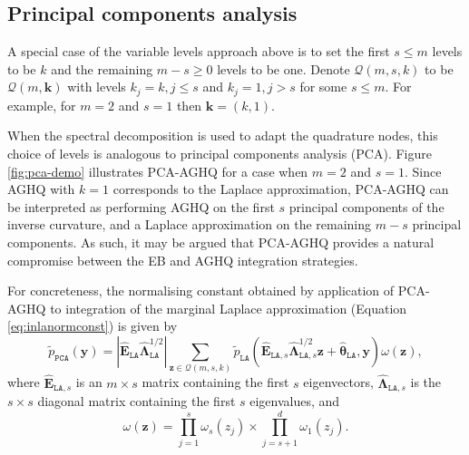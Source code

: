 \documentclass[a4paper, nobind]{templates/ociamthesis}
\begin{document}
\hypertarget{principal-components-analysis}{%
\subsection{Principal components analysis}\label{principal-components-analysis}}

A special case of the variable levels approach above is to set the first \(s \leq m\) levels to be \(k\) and the remaining \(m - s \geq 0\) levels to be one.
Denote \(\mathcal{Q}(m, s, k)\) to be \(\mathcal{Q}(m, \mathbf{k})\) with levels \(k_j = k, j \leq s\) and \(k_j = 1, j > s\) for some \(s \leq m\).
For example, for \(m = 2\) and \(s = 1\) then \(\mathbf{k} = (k, 1)\).

When the spectral decomposition is used to adapt the quadrature nodes, this choice of levels is analogous to principal components analysis (PCA).
Figure \ref{fig:pca-demo} illustrates PCA-AGHQ for a case when \(m = 2\) and \(s = 1\).
Since AGHQ with \(k = 1\) corresponds to the Laplace approximation, PCA-AGHQ can be interpreted as performing AGHQ on the first \(s\) principal components of the inverse curvature, and a Laplace approximation on the remaining \(m - s\) principal components.
As such, it may be argued that PCA-AGHQ provides a natural compromise between the EB and AGHQ integration strategies.

For concreteness, the normalising constant obtained by application of PCA-AGHQ to integration of the marginal Laplace approximation (Equation \eqref{eq:inlanormconst}) is given by
\begin{equation}
\tilde p_\texttt{PCA}(\mathbf{y}) = |\hat{\mathbf{E}}_{\texttt{LA}} \hat{\mathbf{\Lambda}}_{\texttt{LA}}^{1/2}|\sum_{\mathbf{z} \in \mathcal{Q}(m, s, k)} \tilde p_\texttt{LA}(\hat{\mathbf{E}}_{\texttt{LA}, s} \hat{\mathbf{\Lambda}}_{\texttt{LA}, s}^{1/2} \mathbf{z} + \hat{\boldsymbol{\mathbf{\theta}}}_\texttt{LA}, \mathbf{y}) \omega(\mathbf{z}),
\end{equation}
where \(\hat{\mathbf{E}}_{\texttt{LA}, s}\) is an \(m \times s\) matrix containing the first \(s\) eigenvectors, \(\hat{\mathbf{\Lambda}}_{\texttt{LA}, s}\) is the \(s \times s\) diagonal matrix containing the first \(s\) eigenvalues, and
\begin{equation}
\omega(\mathbf{z}) = \prod_{j = 1}^s \omega_s(z_j) \times \prod_{j = s + 1}^d \omega_1(z_j).
\end{equation}
\end{document}
